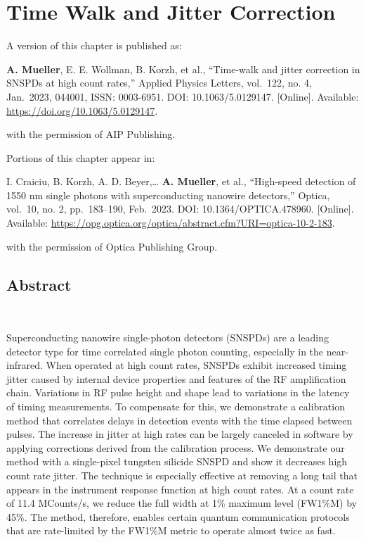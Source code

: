 \documentclass[11pt]{caltech_thesis} %
\begin{document}
\hypertarget{time-walk-and-jitter-correction}{%
\chapter{Time Walk and Jitter Correction}\label{time-walk-and-jitter-correction}}

A version of this chapter is published as:

\textbf{A. Mueller}, E. E. Wollman, B. Korzh, et al., ``Time-walk and jitter correction in SNSPDs at high count rates,'' Applied Physics Letters, vol.~122, no. 4, Jan.~2023, 044001, ISSN: 0003-6951. DOI: 10.1063/5.0129147. {[}Online{]}. Available: \url{https://doi.org/10.1063/5.0129147}.

with the permission of AIP Publishing.

Portions of this chapter appear in:

I. Craiciu, B. Korzh, A. D. Beyer,\ldots{} \textbf{A. Mueller}, et al., ``High-speed detection of 1550 nm single photons with superconducting nanowire detectors,'' Optica, vol.~10, no. 2, pp.~183--190, Feb.~2023. DOI: 10.1364/OPTICA.478960. {[}Online{]}. Available: \url{https://opg.optica.org/optica/abstract.cfm?URI=optica-10-2-183}.

with the permission of Optica Publishing Group.

\hypertarget{abstract-1}{%
\section{Abstract}\label{abstract-1}}

~~~~~

Superconducting nanowire single-photon detectors (SNSPDs) are a leading detector type for time correlated single photon counting, especially in the near-infrared. When operated at high count rates, SNSPDs exhibit increased timing jitter caused by internal device properties and features of the RF amplification chain. Variations in RF pulse height and shape lead to variations in the latency of timing measurements. To compensate for this, we demonstrate a calibration method that correlates delays in detection events with the time elapsed between pulses. The increase in jitter at high rates can be largely canceled in software by applying corrections derived from the calibration process. We demonstrate our method with a single-pixel tungsten silicide SNSPD and show it decreases high count rate jitter. The technique is especially effective at removing a long tail that appears in the instrument response function at high count rates. At a count rate of 11.4 MCounts/s, we reduce the full width at 1\% maximum level (FW1\%M) by 45\%. The method, therefore, enables certain quantum communication protocols that are rate-limited by the FW1\%M metric to operate almost twice as fast.
\end{document}
